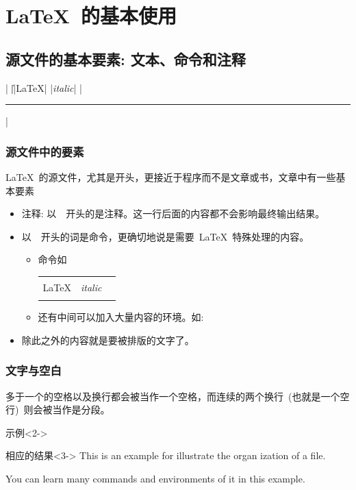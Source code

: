 \section{\LaTeX~的基本使用}

\subsection{源文件的基本要素: 文本、命令和注释}
\Percent|%
\BSP|\|
\vbla|\LaTeX|
\vbit|\textit{italic}|
\vbrl|\rule[.5em]{5em}{1pt}|
\begin{frame}
    \frametitle{源文件中的要素}
    \LaTeX~的源文件，尤其是开头，更接近于程序而不是文章或书，文章中有一些基本要素
    \begin{itemize}[<+->]
	\item 注释: 以~\Percent~开头的是注释。这一行后面的内容都不会影响最终输出结果。
	\item 以~\BSP~开头的词是命令，更确切地说是需要~\LaTeX~特殊处理的内容。
	    \begin{itemize}[<+->]
		\item 命令如\\
		    \begin{tabular}[t]{|c|c|c|}
			\hline
			\vbla & \vbit & \vbrl \\
			\hline
			\LaTeX & \textit{italic} & \rule[.5em]{5em}{1pt} \\
			\hline
		    \end{tabular}
		\item 还有中间可以加入大量内容的环境。如:\\
			
	    \end{itemize}
	\item 除此之外的内容就是要被排版的文字了。
    \end{itemize}
\end{frame}

\begin{frame}
	\frametitle{文字与空白}
	多于一个的空格以及换行都会被当作一个空格，而连续的两个换行~(也就是一个空行)~则会被当作是分段。
	
	\begin{block}{示例}<2->
		
	\end{block}
	\begin{block}{相应的结果}<3->
		This is an          example for illustrate the organ%
		ization of 
		a \LaTeXe file. 
		
		You can learn many commands and environments of it in 
		this example.
	\end{block}
\end{frame}

